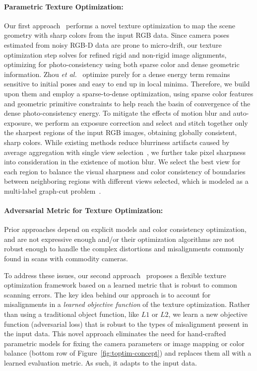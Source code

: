 \paragraph*{Parametric Texture Optimization:}
Our first approach~\cite{huang20173dlite} performs a novel texture optimization to map the scene geometry with sharp colors from the input RGB data.
Since camera poses estimated from noisy RGB-D data are prone to micro-drift, our texture optimization step solves for refined rigid and non-rigid image alignments, optimizing for photo-consistency using both sparse color and dense geometric information.
%
Zhou \textit{et al.}~\cite{zhou2014color} optimize purely for a dense energy term remains sensitive to initial poses and easy to end up in local minima. Therefore, we build upon them and employ a sparse-to-dense optimization, using sparse color features and geometric primitive constraints to help reach the basin of convergence of the dense photo-consistency energy.
%
To mitigate the effects of motion blur and auto-exposure, we perform an exposure correction and select and stitch together only the sharpest regions of the input RGB images, obtaining globally consistent, sharp colors. While existing methods reduce blurriness artifacts caused by average aggregation with single view selection~\cite{dessein2014seamless}, we further take pixel sharpness into consideration in the existence of motion blur. We select the best view for each region to balance the visual sharpness and color consistency of boundaries between neighboring regions with different views selected, which is modeled as a multi-label graph-cut problem~\cite{boykov2001fast}.

\paragraph*{Adversarial Metric for Texture Optimization:}
Prior approaches depend on explicit models and color consistency optimization, and are not expressive enough and/or their optimization algorithms are not robust enough to handle the complex distortions and misalignments commonly found in scans with commodity cameras.

To address these issues, our second approach~\cite{huang2020adversarial} proposes a flexible texture optimization framework based on a learned metric that is robust to common scanning errors.
 The key idea behind our approach is to account for misalignments in a {\em learned objective function} of the texture optimization.   
 Rather than using a traditional object function, like $L1$ or $L2$, we learn a new objective function (adversarial loss) that is robust to the types of misalignment present in the input data.  This novel approach eliminates the need for hand-crafted parametric models for fixing the camera parameters \cite{zhou2014color,huang20173dlite} or image mapping \cite{bi2017patch,zhou2014color} or color balance \cite{huang20173dlite} (bottom row of Figure~\ref{fig:toptim-concept}) and replaces them all with a learned evaluation metric.   As such, it adapts to the input data.
 
